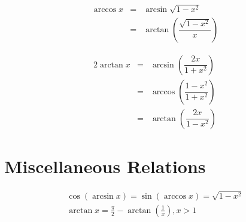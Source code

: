 \begin{equation}
	\begin{aligned}
			\arccos x & = & \arcsin \sqrt{1-x^2}\\
			& = & \arctan \left(\dfrac{\sqrt{1-x^2}}{x}\right)
	\end{aligned}
\end{equation}

\begin{equation}
	\begin{aligned}
			2\arctan x & = & \arcsin\left(\dfrac{2x}{1+x^2}\right)\\
			& = & \arccos \left(\dfrac{1-x^2}{1+x^2}\right)\\
			& = & \arctan \left(\dfrac{2x}{1-x^2}\right)
	\end{aligned}
\end{equation}


\section{Miscellaneous Relations}
\begin{align}
	\cos(\arcsin x)=\sin(\arccos x)=\sqrt{1-x^2}\\
	\arctan x=\frac{\pi}{2}-\arctan\left(\frac{1}{x}\right), x>1
\end{align}

